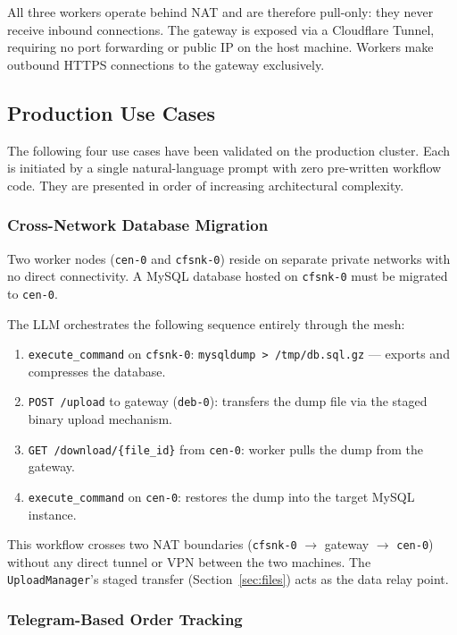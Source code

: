 \documentclass[10pt,twocolumn]{article}
\begin{document}
All three workers operate behind NAT and are therefore pull-only: they
never receive inbound connections. The gateway is exposed via a
Cloudflare Tunnel, requiring no port forwarding or public IP on the
host machine. Workers make outbound HTTPS connections to the gateway
exclusively.

\subsection{Production Use Cases}

The following four use cases have been validated on the production
cluster. Each is initiated by a single natural-language prompt with
zero pre-written workflow code. They are presented in order of
increasing architectural complexity.

\subsubsection{Cross-Network Database Migration}

Two worker nodes (\texttt{cen-0} and \texttt{cfsnk-0}) reside on
separate private networks with no direct connectivity. A MySQL database
hosted on \texttt{cfsnk-0} must be migrated to \texttt{cen-0}.

The LLM orchestrates the following sequence entirely through the mesh:

\begin{enumerate}[noitemsep, leftmargin=14pt]
  \item \texttt{execute\_command} on \texttt{cfsnk-0}: \texttt{mysqldump
    > /tmp/db.sql.gz} — exports and compresses the database.
  \item \texttt{POST /upload} to gateway (\texttt{deb-0}): transfers
    the dump file via the staged binary upload mechanism.
  \item \texttt{GET /download/\{file\_id\}} from \texttt{cen-0}:
    worker pulls the dump from the gateway.
  \item \texttt{execute\_command} on \texttt{cen-0}: restores the dump
    into the target MySQL instance.
\end{enumerate}

This workflow crosses two NAT boundaries (\texttt{cfsnk-0}
$\to$ gateway $\to$ \texttt{cen-0}) without any direct tunnel or VPN
between the two machines. The \texttt{UploadManager}'s staged transfer
(Section~\ref{sec:files}) acts as the data relay point.

\subsubsection{Telegram-Based Order Tracking}
\end{document}
